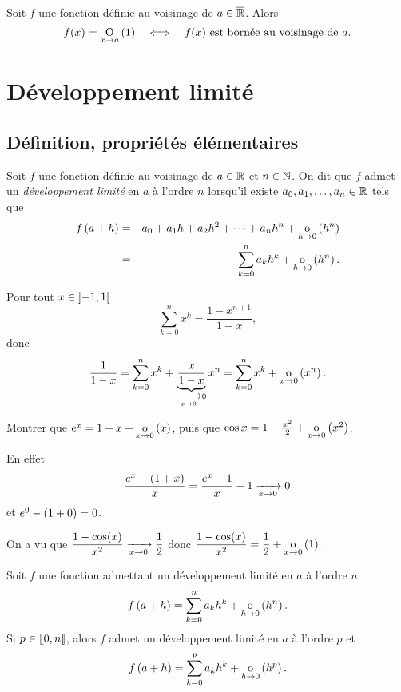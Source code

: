 \documentclass{magnoliaold}
\begin{document}
\begin{proposition}[utile=-3]
Soit $f$ une fonction définie au voisinage de $a\in\overline{\mathbb{R}}$. Alors
\[f(x)=\underset{x \rightarrow a}{\text{O}}\left(1\right) \quad\Longleftrightarrow\quad
  f(x)\text{ est bornée au voisinage de $a$}.\]
\end{proposition}

\section{Développement limité}
\subsection{Définition, propriétés élémentaires}

\begin{definition}[utile=-3]
Soit $f$ une fonction définie au voisinage de $a\in\mathbb{R}$ et $n\in\mathbb{N}$. On dit
que $f$ admet un \emph{développement limité} en $a$ à l'ordre $n$ lorsqu'il
existe $a_0,a_1,\ldots,a_n\in\mathbb{R}$ tels que
\begin{eqnarray*}
f\left(a+h\right) &=& a_0+a_1 h+a_2 h^2+\cdots+a_n h^n+\underset{h \rightarrow 0}{\text{o}}\left(h^n\right)\\
         &=& \sum_{k=0}^n a_k h^k+\underset{h \rightarrow 0}{\text{o}}\left(h^n\right).
\end{eqnarray*}
\end{definition}

\begin{remarqueUnique}
\remarque Pour tout $x\in\left]-1,1\right[$
  \[\sum_{k=0}^n x^k=\frac{1-x^{n+1}}{1-x},\]
  donc
  \[\frac{1}{1-x}
    = \sum_{k=0}^n x^k+\underbrace{\frac{x}{1-x}}_{\xrightarrow[x\rightarrow 0]{}0}x^n
    = \sum_{k=0}^n x^k+\underset{x \rightarrow 0}{\text{o}}\left(x^n\right).\]
\end{remarqueUnique}

\begin{exoUnique}
\exo Montrer que ${\rm e}^x=1+x+\underset{x \rightarrow 0}{\text{o}}\left(x\right)$, puis que $\cos x=1-\frac{x^2}{2}+\underset{x \rightarrow 0}{\text{o}}\left(x^2\right)$.
\end{exoUnique}

\begin{sol}
En effet
   \[\frac{e^x-\left(1+x\right)}{x}=\frac{e^x-1}{x}-1\xrightarrow[x\rightarrow 0]{}0\]
   et $e^0-\left(1+0\right)=0$.
   
   On a vu que $\dfrac{1-\cos(x)}{x^2}\xrightarrow[x\rightarrow 0]{}\dfrac{1}{2}$ donc $\dfrac{1-\cos(x)}{x^2}=\dfrac{1}{2}+\underset{x \rightarrow 0}{\text{o}}\left(1\right).$
\end{sol}

\begin{proposition}[utile=-3, nom={Troncature d'un développement limité}]
Soit $f$ une fonction admettant un développement limité en $a$ à
l'ordre $n$
\[f\left(a+h\right)=\sum_{k=0}^n a_k h^k+\underset{h \rightarrow 0}{\text{o}}\left(h^n\right).\]
Si $p\in\left\llbracket 0,n\right\rrbracket$, alors $f$ admet un développement limité en
$a$ à l'ordre $p$ et
\[f\left(a+h\right)=\sum_{k=0}^p a_k h^k+\underset{h \rightarrow 0}{\text{o}}\left(h^p\right).\]
\end{proposition}
\end{document}
